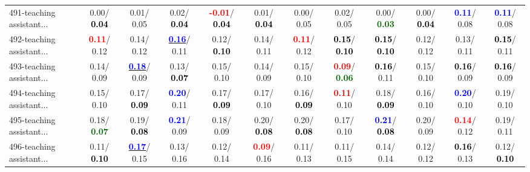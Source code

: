 \begin{table}[h]
\begin{center}
{\begin{tabular}{lc|c|c|c|c|c|c|c|c|c|c}
491-teaching assistant... &   0.00/\textcolor{black}{\textbf{  0.04}} &   0.01/  0.05 &   0.02/\textcolor{black}{\textbf{  0.04}} & \textcolor{red}{\textbf{ -0.01}}/\textcolor{black}{\textbf{  0.04}} &   0.01/\textcolor{black}{\textbf{  0.04}} &   0.00/  0.05 &   0.02/  0.05 &   0.00/\textcolor{darkgreen}{\textbf{  0.03}} &   0.00/\textcolor{black}{\textbf{  0.04}} & \textcolor{blue}{\textbf{  0.11}}/  0.08 & \textcolor{blue}{\textbf{  0.11}}/  0.08 \\
492-teaching assistant... & \textcolor{red}{\textbf{  0.11}}/  0.12 &   0.14/  0.12 & \underline{\textcolor{blue}{\textbf{  0.16}}}/  0.11 &   0.12/\textcolor{black}{\textbf{  0.10}} &   0.14/  0.11 & \textcolor{red}{\textbf{  0.11}}/  0.12 & \textcolor{black}{\textbf{  0.15}}/\textcolor{black}{\textbf{  0.10}} & \textcolor{black}{\textbf{  0.15}}/\textcolor{black}{\textbf{  0.10}} &   0.12/  0.12 &   0.13/  0.11 & \textcolor{black}{\textbf{  0.15}}/  0.11 \\
493-teaching assistant... &   0.14/  0.09 & \underline{\textcolor{blue}{\textbf{  0.18}}}/  0.09 &   0.13/\textcolor{black}{\textbf{  0.07}} &   0.15/  0.10 &   0.14/  0.09 &   0.15/  0.10 & \textcolor{red}{\textbf{  0.09}}/\textcolor{darkgreen}{\textbf{  0.06}} & \textcolor{black}{\textbf{  0.16}}/  0.11 &   0.15/  0.10 & \textcolor{black}{\textbf{  0.16}}/  0.09 & \textcolor{black}{\textbf{  0.16}}/  0.09 \\
494-teaching assistant... &   0.15/  0.10 &   0.17/\textcolor{black}{\textbf{  0.09}} & \textcolor{blue}{\textbf{  0.20}}/  0.11 &   0.17/\textcolor{black}{\textbf{  0.09}} &   0.17/  0.10 &   0.16/\textcolor{black}{\textbf{  0.09}} & \textcolor{red}{\textbf{  0.11}}/  0.10 &   0.18/\textcolor{black}{\textbf{  0.09}} &   0.16/  0.10 & \textcolor{blue}{\textbf{  0.20}}/  0.10 &   0.19/  0.10 \\ \hline
495-teaching assistant... &   0.18/\textcolor{darkgreen}{\textbf{  0.07}} &   0.19/\textcolor{black}{\textbf{  0.08}} & \textcolor{blue}{\textbf{  0.21}}/  0.09 &   0.18/  0.09 &   0.20/\textcolor{black}{\textbf{  0.08}} &   0.20/\textcolor{black}{\textbf{  0.08}} &   0.17/  0.10 & \textcolor{blue}{\textbf{  0.21}}/\textcolor{black}{\textbf{  0.08}} &   0.20/  0.09 & \textcolor{red}{\textbf{  0.14}}/  0.12 &   0.19/  0.11 \\
496-teaching assistant... &   0.11/\textcolor{black}{\textbf{  0.10}} & \underline{\textcolor{blue}{\textbf{  0.17}}}/  0.15 &   0.13/  0.16 &   0.12/  0.14 & \textcolor{red}{\textbf{  0.09}}/  0.16 &   0.11/  0.13 &   0.11/  0.15 &   0.14/  0.14 &   0.12/  0.12 & \textcolor{black}{\textbf{  0.16}}/  0.13 &   0.12/\textcolor{black}{\textbf{  0.10}} \\

\end{tabular}}
\end{center}
\end{table}
